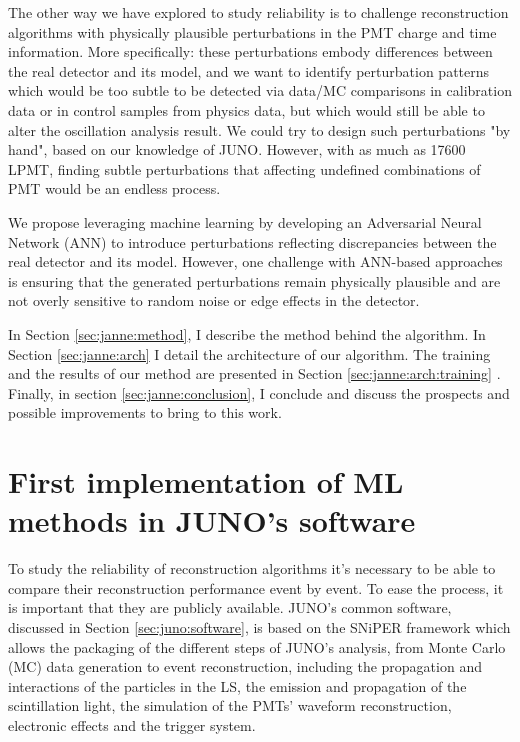 \documentclass[../main.tex]{subfiles}
\begin{document}
The other way we have explored to study reliability is to challenge reconstruction algorithms with physically plausible perturbations in the PMT charge and time information. More specifically: these perturbations embody differences between the real detector and its model,  and we want to identify perturbation patterns which  would be too subtle to be detected via data/MC comparisons in calibration data or in control samples from physics data, but which would still be able to alter the oscillation analysis result.  We could try to design such perturbations "by hand", based on our knowledge of JUNO. However, with as much as 17600 LPMT, finding subtle perturbations that affecting undefined combinations of PMT would be an endless process.

We propose leveraging machine learning by developing an Adversarial Neural Network (ANN) to introduce perturbations reflecting discrepancies between the real detector and its model. However, one challenge with ANN-based approaches is ensuring that the generated perturbations remain physically plausible and are not overly sensitive to random noise or edge effects in the detector.

In Section \ref{sec:janne:method}, I describe the method behind the algorithm. In Section \ref{sec:janne:arch} I detail the architecture of our algorithm.
The training and the results of our method are presented in Section \ref{sec:janne:arch:training} . Finally, in section \ref{sec:janne:conclusion}, I conclude and discuss the prospects and possible improvements to bring to this work.


\section{First implementation of ML methods in JUNO's software}
\label{sec:janne:BDTE}

To study the reliability of reconstruction algorithms it's necessary to be able to compare their reconstruction performance event by event. To ease the process, it is important that they are publicly available. JUNO's common software, discussed in Section \ref{sec:juno:software}, is based on the SNiPER framework \cite{lin_application_2017} which allows the packaging of the different steps of JUNO's analysis, from Monte Carlo (MC) data generation to event reconstruction, including the propagation and interactions of the particles in the LS, the emission and propagation of the scintillation light, the simulation of the PMTs' waveform reconstruction, electronic effects and the trigger system.
\end{document}
